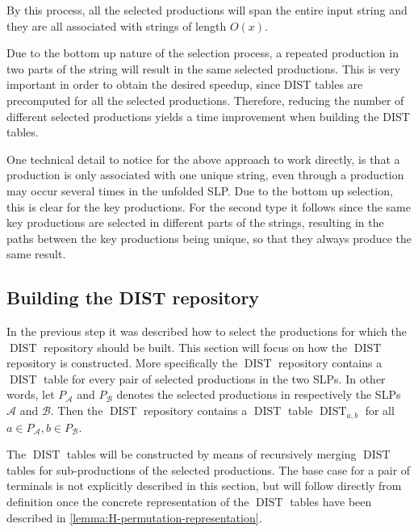 \documentclass[twoside,11pt,openright]{report}
\newcommand{\DIST}{\operatorname{DIST}}
\begin{document}
By this process, all the selected productions will span the entire input string and they are all associated with strings of length $O(x)$.

Due to the bottom up nature of the selection process, a repeated production in two parts of the string will result in the same selected productions. This is very important in order to obtain the desired speedup, since DIST tables are precomputed for all the selected productions. Therefore, reducing the number of different selected productions yields a time improvement when building the DIST tables.

One technical detail to notice for the above approach to work directly, is that a production is only associated with one unique string, even through a production may occur several times in the unfolded SLP. Due to the bottom up selection, this is clear for the key productions. For the second type it follows since the same key productions are selected in different parts of the strings, resulting in the paths between the key productions being unique, so that they always produce the same result.

\subsection{Building the DIST repository}
\label{sec:algorithm:building-DISTs-overview}
In the previous step it was described how to select the productions for which the $\DIST$ repository should be built. This section will focus on how the $\DIST$ repository is constructed. More specifically the $\DIST$ repository contains a $\DIST$ table for every pair of selected productions in the two SLPs. In other words, let $P_\mathcal{A}$ and $P_\mathcal{B}$ denotes the selected productions in respectively the SLPs $\mathcal{A}$ and $\mathcal{B}$. Then the $\DIST$ repository contains a $\DIST$ table $\DIST_{a,b}$ for all $a \in P_\mathcal{A}, b \in P_{\mathcal{B}}$.

The $\DIST$ tables will be constructed by means of recursively merging $\DIST$ tables for sub-productions of the selected productions. The base case for a pair of terminals is not explicitly described in this section, but will follow directly from definition once the concrete representation of the $\DIST$ tables have been described in \cref{lemma:H-permutation-representation}.
\end{document}
